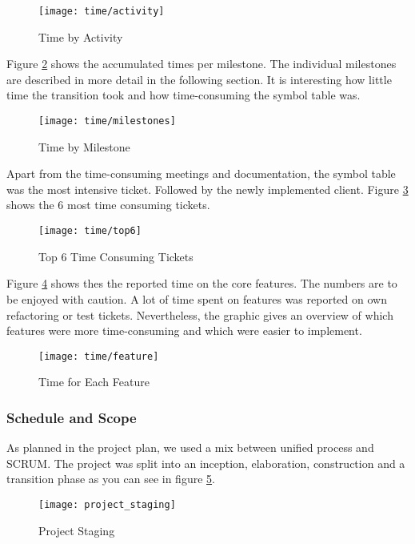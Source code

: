 \begin{figure}[H]
    \centering
    \texttt{[image: time/activity]}
    \caption{Time by Activity}
    \label{fig:timetracking_activity}
\end{figure}

Figure \ref{fig:time_milestones} shows the accumulated times per milestone.
The individual milestones are described in more detail in the following section.
It is interesting how little time the transition took and how time-consuming the symbol table was.

\begin{figure}[H]
    \centering
    \texttt{[image: time/milestones]}
    \caption{Time by Milestone}
    \label{fig:time_milestones}
\end{figure}

Apart from the time-consuming meetings and documentation, the symbol table was the most intensive ticket.
Followed by the newly implemented client.
Figure \ref{fig:time_ticket} shows the 6 most time consuming tickets.

\begin{figure}[H]
    \centering
    \texttt{[image: time/top6]}
    \caption{Top 6 Time Consuming Tickets}
    \label{fig:time_ticket}
\end{figure}

Figure \ref{fig:time_feature} shows thes the reported time on the core features.
The numbers are to be enjoyed with caution.
A lot of time spent on features was reported on own refactoring or test tickets.
Nevertheless, the graphic gives an overview of which features
were more time-consuming and which were easier to implement.

\begin{figure}[H]
    \centering
    \texttt{[image: time/feature]}
    \caption{Time for Each Feature}
    \label{fig:time_feature}
\end{figure}

\subsubsection{Schedule and Scope}
As planned in the project plan, we used a mix between unified process and SCRUM.
The project was split into an inception, elaboration, construction and a transition phase
as you can see in figure \ref{fig:project_staging}.

\begin{figure}[H]
    \centering
    \texttt{[image: project\_staging]}
    \caption{Project Staging}
    \label{fig:project_staging}
\end{figure}

